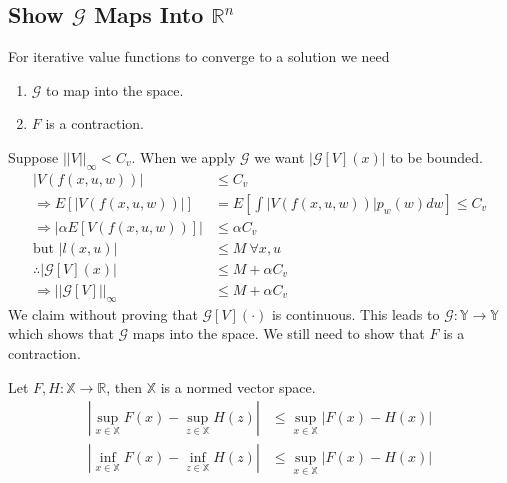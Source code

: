 \documentclass[lecture,12pt,]{pcms-l}
\begin{document}
\subsection{Show $\mathcal{G}$ Maps Into $\mathbb{R}^n$}
For iterative value functions to converge to a solution we need
\begin{enumerate}
\item $\mathcal{G}$ to map into the space.
\item $F$ is a contraction.
\end{enumerate}
Suppose $||V||_\infty<C_v$. When we apply $\mathcal{G}$ we want $|\mathcal{G}[V](x)|$ to be bounded.
\begin{align*}
|V(f(x,u,w))| &\leq C_v \\
\Rightarrow E[|V(f(x,u,w))|] &= E[\int|V(f(x,u,w))|p_w(w)dw] \leq C_v \\
\Rightarrow |\alpha E[V(f(x,u,w))]| &\leq \alpha C_v \\
\text{but } |l(x,u)| &\leq M ~\forall x,u \\
\therefore |\mathcal{G}[V](x)| &\leq M + \alpha C_v \\
\Rightarrow ||\mathcal{G}[V]||_\infty &\leq M + \alpha C_v
\end{align*}
We claim without proving that $\mathcal{G}[V](\cdot)$ is continuous. This leads to $\mathcal{G}:\mathbb{Y}\to\mathbb{Y}$ which shows that $\mathcal{G}$ maps into the space. We still need to show that $F$ is a contraction.

\begin{theorem}
\label{th:nvs}
Let $F,H:\mathbb{X}\to\mathbb{R}$, then $\mathbb{X}$ is a normed vector space.
\begin{align*}
|\sup_{x\in\mathbb{X}}F(x) - \sup_{z\in\mathbb{X}}H(z)| &\leq \sup_{x\in\mathbb{X}}|F(x)-H(x)| \\
|\inf_{x\in\mathbb{X}}F(x) - \inf_{z\in\mathbb{X}}H(z)| &\leq \sup_{x\in\mathbb{X}}|F(x)-H(x)|
\end{align*}
\end{theorem}
\end{document}
